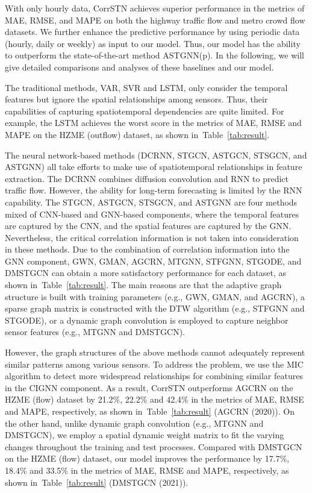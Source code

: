 \documentclass[sn-mathphys,iicol]{sn-jnl}
\newcommand\tabref[1]{Table~\ref{#1}}
\theoremstyle{thmstyleone}\newtheorem{theorem}{Theorem}\newtheorem{proposition}[theorem]{Proposition}
\theoremstyle{thmstyletwo}\newtheorem{example}{Example}\newtheorem{remark}{Remark}
\theoremstyle{thmstylethree}\newtheorem{definition}{Definition}
\begin{document}
 With only hourly data, CorrSTN achieves superior performance in the metrics of MAE, RMSE, and MAPE on both the highway traffic flow and metro crowd flow datasets. We further enhance the predictive performance by using periodic data (hourly, daily or weekly) as input to our model. Thus, our model has the ability to outperform the state-of-the-art method ASTGNN(p). In the following, we will give detailed comparisons and analyses of these baselines and our model.

The traditional methods, VAR, SVR and LSTM, only consider the temporal features but ignore the spatial relationships among sensors. Thus, their capabilities of capturing spatiotemporal dependencies are quite limited. For example, the LSTM achieves the worst score in the metrics of MAE, RMSE and MAPE on the HZME (outflow) dataset, as shown in~\tabref{tab:result}.

The neural network-based methods (DCRNN, STGCN, ASTGCN, STSGCN, and ASTGNN) all take efforts to make use of spatiotemporal relationships in feature extraction. The DCRNN combines diffusion convolution and RNN to predict traffic flow. However, the ability for long-term forecasting is limited by the RNN capability. The STGCN, ASTGCN, STSGCN, and ASTGNN are four methods mixed of CNN-based and GNN-based components, where the temporal features are captured by the CNN, and the spatial features are captured by the GNN. Nevertheless, the critical correlation information is not taken into consideration in these methods. Due to the combination of correlation information into the GNN component, GWN, GMAN, AGCRN, MTGNN, STFGNN, STGODE, and DMSTGCN can obtain a more satisfactory performance for each dataset, as shown in~\tabref{tab:result}. The main reasons are that the adaptive graph structure is built with training parameters (e.g., GWN, GMAN, and AGCRN), a sparse graph matrix is constructed with the DTW algorithm (e.g., STFGNN and STGODE), or a dynamic graph convolution is employed to capture neighbor sensor features (e.g., MTGNN and DMSTGCN).

However, the graph structures of the above methods cannot adequately represent similar patterns among various sensors. To address the problem, we use the MIC algorithm to detect more widespread relationships for combining similar features in the CIGNN component. As a result, CorrSTN outperforms AGCRN on the HZME (flow) dataset by 21.2\%, 22.2\% and 42.4\% in the metrics of MAE, RMSE and MAPE, respectively, as shown in~\tabref{tab:result} (AGCRN (2020)). On the other hand, unlike dynamic graph convolution (e.g., MTGNN and DMSTGCN), we employ a spatial dynamic weight matrix to fit the varying changes throughout the training and test processes. Compared with DMSTGCN on the HZME (flow) dataset, our model improves the performance by 17.7\%, 18.4\% and 33.5\% in the metrics of MAE, RMSE and MAPE, respectively, as shown in~\tabref{tab:result} (DMSTGCN (2021)).
\end{document}
